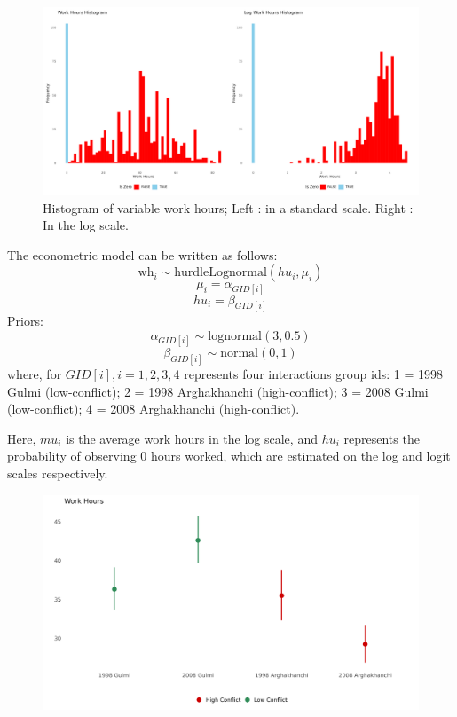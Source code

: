 \documentclass[12pt,a4paper]{article}
\begin{document}
\begin{figure}[H]
	\centering
	\includegraphics[width=1\textwidth]{../Analysis files/wh_histogram.jpg}
	\caption{Histogram of variable work hours; Left : in a standard scale. Right : In the log scale.}
	\label{fig:wh_histogram}
\end{figure}

The econometric model can be written as follows:
$$\text{wh}_{i} \sim \text{hurdleLognormal}(hu_i, \mu_i)$$
$$\mu_{i} = \alpha_{GID[i]}$$
$$hu_{i} = \beta_{GID[i]}$$
Priors:
$$\alpha_{GID[i]} \sim \text{lognormal}(3, 0.5)$$
$$\beta_{GID[i]} \sim \text{normal}(0, 1)$$
where, for $GID[i], i = {1, 2, 3, 4}$ represents four interactions group ids: 1 = 1998 Gulmi (low-conflict); 2 = 1998 Arghakhanchi (high-conflict); 3 = 2008 Gulmi (low-conflict); 4 = 2008 Arghakhanchi (high-conflict).

Here, $mu_i$ is the average work hours in the log scale, and $hu_i$ represents the probability of observing $0$ hours worked, which are estimated on the log and logit scales respectively.






\begin{figure}[H]
	\centering
	\includegraphics[width=1\textwidth]{../Analysis files/coefplot_map.jpg}
	\caption{}
	\label{fig:coefplot_map}
\end{figure}
\end{document}

